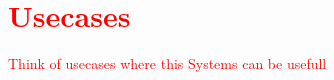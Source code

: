 \chapter{\textcolor{red}{Usecases}}
\textcolor{red}{Think of usecases where this Systems can be usefull}